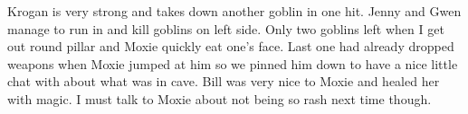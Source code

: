 Krogan is very strong and takes down another goblin in one hit. Jenny and Gwen manage to run in and kill goblins on left side. Only two goblins left when I get out round pillar and Moxie quickly eat one’s face. Last one had already dropped weapons when Moxie jumped at him so we pinned him down to have a nice little chat with about what was in cave. Bill was very nice to Moxie and healed her with magic. I must talk to Moxie about not being so rash next time though.\medskip

\vspace*{5mm}

